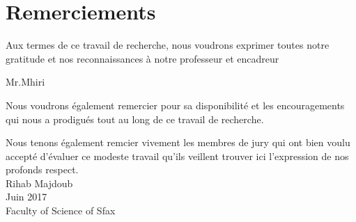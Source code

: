 \cleardoublepage
\section*{Remerciements}
\vspace{1.0in}
Aux termes de ce travail de recherche, nous voudrons exprimer toutes 
notre gratitude et nos reconnaissances à notre professeur et encadreur
\\[0.2in]
\begin{center}
 Mr.Mhiri
 \\[0.2in]
\end{center}
Nous voudrons également remercier pour sa disponibilité et les
encouragements qui nous a prodigués tout au long de ce travail
de recherche.

Nous tenons également remcier vivement les membres de jury qui 
ont bien voulu accepté d'évaluer ce modeste travail qu'ils 
veillent trouver ici l'expression de nos profonds respect.
\\[0.2in]

Rihab Majdoub \\[0.2in]
Juin 2017 \\
Faculty of Science of Sfax
